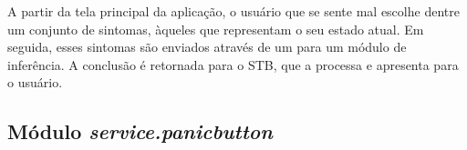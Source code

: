 
A partir da tela principal da aplicação, o usuário que se sente mal escolhe 
dentre um conjunto de sintomas, àqueles que representam o seu estado atual. Em
seguida, esses sintomas são enviados através de um \webservice[] para um
módulo de inferência. A conclusão é retornada para o STB, que a processa e 
apresenta para o usuário.

\subsection{Módulo \textit{service.panicbutton}}\label{subsec:panicbutton}
